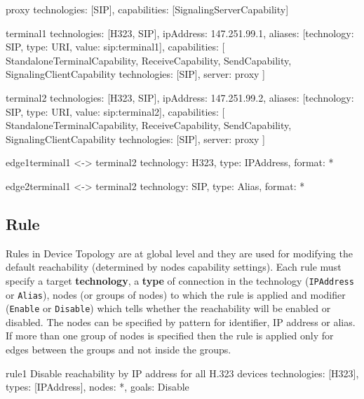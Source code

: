\begin{EntityExample}{}{proxy}{}
technologies: [SIP],
capabilities: [SignalingServerCapability]
\end{EntityExample}

\begin{EntityExample}{}{terminal1}{}
technologies: [H323, SIP],
ipAddress: 147.251.99.1,
aliases: [{technology: SIP, type: URI, value: sip:terminal1}],
capabilities: [
  StandaloneTerminalCapability,
  ReceiveCapability, SendCapability,
  SignalingClientCapability {technologies: [SIP], server: proxy}
]
\end{EntityExample}

\begin{EntityExample}{}{terminal2}{}
technologies: [H323, SIP],
ipAddress: 147.251.99.2,
aliases: [{technology: SIP, type: URI, value: sip:terminal2}],
capabilities: [
  StandaloneTerminalCapability,
  ReceiveCapability, SendCapability,
  SignalingClientCapability {technologies: [SIP], server: proxy}
]
\end{EntityExample}

\begin{EntityExample}{}{edge1}{terminal1 <-> terminal2}
technology: H323,
type: IPAddress,
format: *
\end{EntityExample}

\begin{EntityExample}{}{edge2}{terminal1 <-> terminal2}
technology: SIP,
type: Alias,
format: *
\end{EntityExample} 
  
  
\subsection{Rule}
Rules in Device Topology are at global level and they are used for modifying 
the default reachability (determined by nodes capability settings). Each rule 
must specify a target \textbf{technology}, a \textbf{type} of connection in 
the technology (\verb|IPAddress| or \verb|Alias|), 
nodes (or groups of nodes) 
to which the rule is applied and modifier (\verb|Enable| or \verb|Disable|) 
which tells whether the reachability will be enabled or disabled. The nodes 
can be specified by pattern for identifier, IP address or alias. If more than 
one group of nodes is specified then the rule is applied only for edges 
between the groups and not inside the groups.

\begin{EntityExample}{}{rule1}%
      {Disable reachability by IP address for all H.323 devices}
technologies: [H323],
types: [IPAddress],
nodes: *,
goals: Disable
\end{EntityExample}

